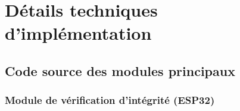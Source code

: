 
\appendix

\chapter{Détails techniques d'implémentation}
\label{app:technical-details}

\section{Code source des modules principaux}

\subsection{Module de vérification d'intégrité (ESP32)}

